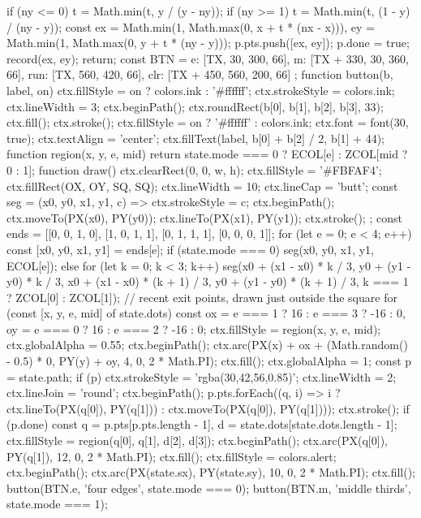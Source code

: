 \begin{js}[size=1640x680, frames=1, alt="Interactive: Brownian paths in a square, started at a point you click; exit points are colored by edge, or by middle thirds versus outer thirds, with running counts"]
{{    if (ny <= 0) t = Math.min(t, y / (y - ny)); if (ny >= 1) t = Math.min(t, (1 - y) / (ny - y));
    const ex = Math.min(1, Math.max(0, x + t * (nx - x))), ey = Math.min(1, Math.max(0, y + t * (ny - y)));
    p.pts.push([ex, ey]); p.done = true; record(ex, ey); return;
  }
}
const BTN = { e: [TX, 30, 300, 66], m: [TX + 330, 30, 360, 66], run: [TX, 560, 420, 66], clr: [TX + 450, 560, 200, 66] };
function button(b, label, on) {
  ctx.fillStyle = on ? colors.ink : '#ffffff'; ctx.strokeStyle = colors.ink; ctx.lineWidth = 3;
  ctx.beginPath(); ctx.roundRect(b[0], b[1], b[2], b[3], 33); ctx.fill(); ctx.stroke();
  ctx.fillStyle = on ? '#ffffff' : colors.ink; ctx.font = font(30, true); ctx.textAlign = 'center';
  ctx.fillText(label, b[0] + b[2] / 2, b[1] + 44);
}
function region(x, y, e, mid) { return state.mode === 0 ? ECOL[e] : ZCOL[mid ? 0 : 1]; }
function draw() {
  ctx.clearRect(0, 0, w, h);
  ctx.fillStyle = '#FBFAF4'; ctx.fillRect(OX, OY, SQ, SQ);
  ctx.lineWidth = 10; ctx.lineCap = 'butt';
  const seg = (x0, y0, x1, y1, c) => { ctx.strokeStyle = c; ctx.beginPath(); ctx.moveTo(PX(x0), PY(y0)); ctx.lineTo(PX(x1), PY(y1)); ctx.stroke(); };
  const ends = [[0, 0, 1, 0], [1, 0, 1, 1], [0, 1, 1, 1], [0, 0, 0, 1]];
  for (let e = 0; e < 4; e++) {
    const [x0, y0, x1, y1] = ends[e];
    if (state.mode === 0) seg(x0, y0, x1, y1, ECOL[e]);
    else for (let k = 0; k < 3; k++) seg(x0 + (x1 - x0) * k / 3, y0 + (y1 - y0) * k / 3, x0 + (x1 - x0) * (k + 1) / 3, y0 + (y1 - y0) * (k + 1) / 3, k === 1 ? ZCOL[0] : ZCOL[1]);
  }
  // recent exit points, drawn just outside the square
  for (const [x, y, e, mid] of state.dots) {
    const ox = e === 1 ? 16 : e === 3 ? -16 : 0, oy = e === 0 ? 16 : e === 2 ? -16 : 0;
    ctx.fillStyle = region(x, y, e, mid); ctx.globalAlpha = 0.55;
    ctx.beginPath(); ctx.arc(PX(x) + ox + (Math.random() - 0.5) * 0, PY(y) + oy, 4, 0, 2 * Math.PI); ctx.fill();
  }
  ctx.globalAlpha = 1;
  const p = state.path;
  if (p) {
    ctx.strokeStyle = 'rgba(30,42,56,0.85)'; ctx.lineWidth = 2; ctx.lineJoin = 'round';
    ctx.beginPath(); p.pts.forEach((q, i) => i ? ctx.lineTo(PX(q[0]), PY(q[1])) : ctx.moveTo(PX(q[0]), PY(q[1]))); ctx.stroke();
    if (p.done) { const q = p.pts[p.pts.length - 1], d = state.dots[state.dots.length - 1]; ctx.fillStyle = region(q[0], q[1], d[2], d[3]); ctx.beginPath(); ctx.arc(PX(q[0]), PY(q[1]), 12, 0, 2 * Math.PI); ctx.fill(); }
  }
  ctx.fillStyle = colors.alert; ctx.beginPath(); ctx.arc(PX(state.sx), PY(state.sy), 10, 0, 2 * Math.PI); ctx.fill();
  button(BTN.e, 'four edges', state.mode === 0); button(BTN.m, 'middle thirds', state.mode === 1);
}
\end{js}
